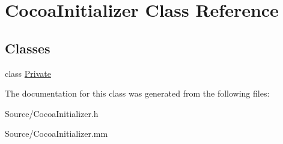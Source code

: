 \hypertarget{classCocoaInitializer}{}\section{Cocoa\+Initializer Class Reference}
\label{classCocoaInitializer}
\subsection*{Classes}
\begin{DoxyCompactItemize}
\item 
class \hyperlink{classCocoaInitializer_1_1Private}{Private}
\end{DoxyCompactItemize}


The documentation for this class was generated from the following files\+:\begin{DoxyCompactItemize}
\item 
Source/Cocoa\+Initializer.\+h\item 
Source/Cocoa\+Initializer.\+mm\end{DoxyCompactItemize}
